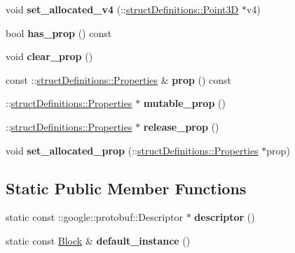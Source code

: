 \begin{DoxyCompactItemize}
void {\bfseries set\+\_\+allocated\+\_\+v4} (\+::\hyperlink{classstruct_definitions_1_1_point3_d}{struct\+Definitions\+::\+Point3D} $\ast$v4)
\item 
\hypertarget{classstruct_definitions_1_1_block_a384b69faae3563ff1d6f8d026b385ea9}{}\label{classstruct_definitions_1_1_block_a384b69faae3563ff1d6f8d026b385ea9} 
bool {\bfseries has\+\_\+prop} () const
\item 
\hypertarget{classstruct_definitions_1_1_block_a65e695964db551d5ab2d6ec40144fbe6}{}\label{classstruct_definitions_1_1_block_a65e695964db551d5ab2d6ec40144fbe6} 
void {\bfseries clear\+\_\+prop} ()
\item 
\hypertarget{classstruct_definitions_1_1_block_a0668e888a028e8d8bb2a54a9f62bfbca}{}\label{classstruct_definitions_1_1_block_a0668e888a028e8d8bb2a54a9f62bfbca} 
const \+::\hyperlink{classstruct_definitions_1_1_properties}{struct\+Definitions\+::\+Properties} \& {\bfseries prop} () const
\item 
\hypertarget{classstruct_definitions_1_1_block_af632dff967b0ad78a4d5e641cd7cefb4}{}\label{classstruct_definitions_1_1_block_af632dff967b0ad78a4d5e641cd7cefb4} 
\+::\hyperlink{classstruct_definitions_1_1_properties}{struct\+Definitions\+::\+Properties} $\ast$ {\bfseries mutable\+\_\+prop} ()
\item 
\hypertarget{classstruct_definitions_1_1_block_aa42e1650e493cfa7b031d4b5d1d6a23c}{}\label{classstruct_definitions_1_1_block_aa42e1650e493cfa7b031d4b5d1d6a23c} 
\+::\hyperlink{classstruct_definitions_1_1_properties}{struct\+Definitions\+::\+Properties} $\ast$ {\bfseries release\+\_\+prop} ()
\item 
\hypertarget{classstruct_definitions_1_1_block_ab306ac8e70ade93708d297d44689799a}{}\label{classstruct_definitions_1_1_block_ab306ac8e70ade93708d297d44689799a} 
void {\bfseries set\+\_\+allocated\+\_\+prop} (\+::\hyperlink{classstruct_definitions_1_1_properties}{struct\+Definitions\+::\+Properties} $\ast$prop)
\end{DoxyCompactItemize}
\subsection*{Static Public Member Functions}
\begin{DoxyCompactItemize}
\item 
\hypertarget{classstruct_definitions_1_1_block_a99cefdf30753b2eaec98c94af8f79988}{}\label{classstruct_definitions_1_1_block_a99cefdf30753b2eaec98c94af8f79988} 
static const \+::google\+::protobuf\+::\+Descriptor $\ast$ {\bfseries descriptor} ()
\item 
\hypertarget{classstruct_definitions_1_1_block_ab486fd4fd4cfb8cafbc2d6b841b8e2ec}{}\label{classstruct_definitions_1_1_block_ab486fd4fd4cfb8cafbc2d6b841b8e2ec} 
static const \hyperlink{classstruct_definitions_1_1_block}{Block} \& {\bfseries default\+\_\+instance} ()
\end{DoxyCompactItemize}
